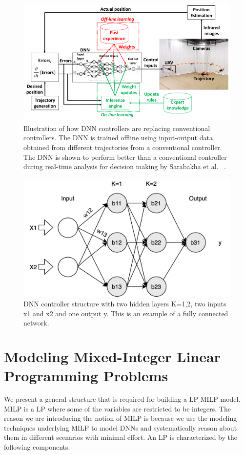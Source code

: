 \begin{figure}
	\centering
	\includegraphics[width=0.7\linewidth]{Images/DNNcontroller}
	\caption{Illustration of how DNN controllers are replacing conventional controllers. The DNN is trained offline using input-output data obtained from different trajectories from a conventional controller. The DNN is shown to perform better than a conventional controller during real-time analysis for decision making by  Sarabakha et al. ~\cite{sarabakha2019online}.}
	\label{fig:dnncontroller}
\end{figure}

\begin{figure}
	\centering
	\includegraphics[width=0.7\linewidth]{Images/DNNstructure}
	\caption[DNN structure]{DNN controller structure with two hidden layers K=1,2, two inputs x1 and x2 and one output y. This is an example of a fully connected network.}
	\label{fig:dnn-controller}
\end{figure}

\section{Modeling Mixed-Integer Linear Programming Problems}
\label{milp}
We present a general structure that is required for building a \ac{LP} \ac{MILP} model.
\ac{MILP} is a \ac{LP} where some of the variables are restricted to be integers. 
The reason we are introducing the notion of \ac{MILP} is because we use the modeling techniques underlying \ac{MILP} to model \ac{DNN}s and systematically reason about them in different scenarios with minimal effort. 
An \ac{LP} is characterized by the following components. 

